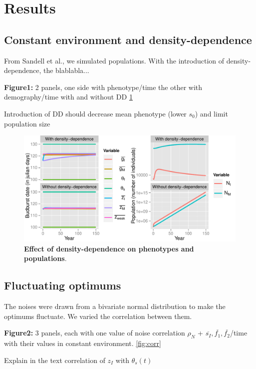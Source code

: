 \label{sec:Res}
\section*{Results}

\subsection*{Constant environment and density-dependence}

From Sandell et al., we simulated populations. With the introduction of density-dependence, the blablabla...

\textbf{Figure1:} 2 panels, one side with phenotype/time the other with demography/time with and without DD \ref{fig:dd}

Introduction of DD should decrease mean phenotype (lower $s_{0}$) and limit population size

\begin{figure}[ht!]
	\centering
	\label{fig:dd}
	\includegraphics[scale=1]{Figures/Figure1.pdf}
	\caption{\textbf{Effect of density-dependence on phenotypes and populations}.}
\end{figure}

\subsection*{Fluctuating optimums}

The noises were drawn from a bivariate normal distribution to make the optimums fluctuate. We varied the correlation between them.

\textbf{Figure2:} 3 panels, each with one value of noise correlation $\rho_{N}$ + $\overline{s_{I}}, \overline{f_{1}}, \overline{f_{2}}$/time with their values in constant environment.
\ref{fig:corr}

Explain in the text correlation of $z_{I}$ with $\theta_{s}(t)$

